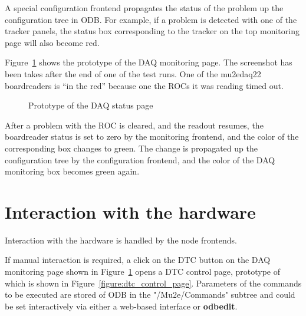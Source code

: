 A special configuration frontend propagates the status of the problem up the
configuration tree in ODB. For example, if a problem is detected with one of the
tracker panels, the status box corresponding to the tracker on the top monitoring
page will also become red.

Figure~\ref{figure:daq_status} shows the prototype of the DAQ monitoring page.
The screenshot has been takes after the end of one of the test runs.
One of the mu2edaq22 boardreaders is ``in the red'' because one the ROCs it
was reading timed out.

\begin{figure}[H]
  \caption{
    \label{figure:daq_status}
    Prototype of the DAQ status page
  }
\end{figure}

After a problem with the ROC is cleared, and the readout resumes, the boardreader status
is set to zero by the monitoring frontend, and the color of the corresponding box changes to green.
The change is propagated up the configuration tree by the configuration frontend,
and the color of the DAQ monitoring box becomes green again.

\section{Interaction with the hardware}

Interaction with the hardware is handled by the node frontends.

If manual interaction is required, a click on the DTC button on the DAQ monitoring
page shown in Figure~\ref{figure:daq_status} opens a DTC control page, prototype of which
is shown in  Figure~\ref{figure:dtc_control_page}. Parameters of the commands to be executed
are stored of ODB in the "/Mu2e/Commands" subtree and could be set interactively
via either a web-based interface or {\bf odbedit}. 

